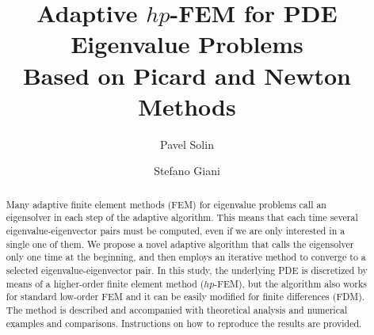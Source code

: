 \documentclass[preprint ,12pt]{elsarticle}
\begin{document}
\begin{frontmatter}



\title{Adaptive $hp$-FEM for PDE Eigenvalue Problems\\ Based on Picard and Newton Methods}

\author[label1,label2]{Pavel Solin}
\author[label3]{Stefano Giani}
\address[label1]{Department of Mathematics and Statistics, University of Nevada, Reno, USA}
\address[label2]{Institute of Thermomechanics, Academy of Sciences of the Czech Republic, Prague}
\address[label3]{School of Mathematical Sciences, University of Nottingham, United Kingdom}



\begin{abstract}
Many adaptive finite element methods (FEM) for eigenvalue problems call an 
eigensolver in each step of the adaptive algorithm. This means that 
each time several eigenvalue-eigenvector pairs must be computed, 
even if we are only interested in a single one of them. We propose a novel 
adaptive algorithm that calls the eigensolver only one time at the 
beginning, and then employs an iterative method to converge to a selected 
eigenvalue-eigenvector pair. 
In this study, the underlying PDE is discretized by means of a higher-order 
finite element method ($hp$-FEM), but the algorithm also works for standard 
low-order FEM and it can be easily modified for finite differences (FDM). 
The method is described and accompanied with theoretical analysis and 
numerical examples and comparisons. Instructions on how to reproduce the results 
are provided. 
\end{abstract}


\end{frontmatter}
\end{document}

